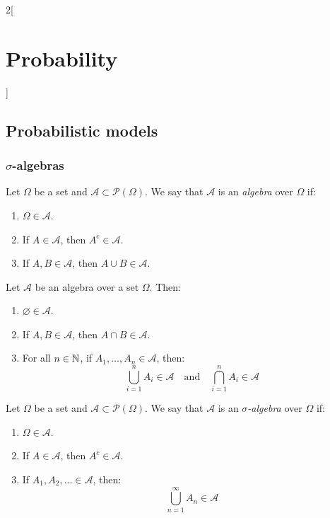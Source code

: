 \documentclass[../../../main.tex]{subfiles}
\begin{document}
\begin{multicols}{2}[\section{Probability}]
    \subsection{Probabilistic models}
    \subsubsection{\texorpdfstring{$\sigma$}{sigma}-algebras}
    \begin{definition}[Algebra]
        Let $\Omega$ be a set and $\mathcal{A}\subset\mathcal{P}(\Omega)$. We say that $\mathcal{A}$ is an \textit{algebra} over $\Omega$ if:
        \begin{enumerate}
            \item $\Omega\in\mathcal{A}$.
            \item If $A\in\mathcal{A}$, then $A^c\in\mathcal{A}$.
            \item If $A,B\in\mathcal{A}$, then $A\cup B\in\mathcal{A}$.
        \end{enumerate}
    \end{definition}
    \begin{prop}
        Let $\mathcal{A}$ be an algebra over a set $\Omega$. Then:
        \begin{enumerate}
            \item $\varnothing\in\mathcal{A}$.
            \item If $A,B\in\mathcal{A}$, then $A\cap B\in\mathcal{A}$.
            \item For all $n\in\mathbb{N}$, if $A_1,\ldots,A_n\in\mathcal{A}$, then: $$\bigcup_{i=1}^nA_i\in\mathcal{A}\quad\text{and}\quad\bigcap_{i=1}^nA_i\in\mathcal{A}$$
        \end{enumerate}
    \end{prop}
    \begin{definition}
        Let $\Omega$ be a set and $\mathcal{A}\subset\mathcal{P}(\Omega)$. We say that $\mathcal{A}$ is an \textit{$\sigma$-algebra} over $\Omega$ if:
        \begin{enumerate}
            \item $\Omega\in\mathcal{A}$.
            \item If $A\in\mathcal{A}$, then $A^c\in\mathcal{A}$.
            \item If $A_1,A_2,\ldots\in\mathcal{A}$, then: $$\bigcup_{n=1}^\infty A_n\in\mathcal{A}$$

\end{enumerate}
\end{definition}
\end{multicols}
\end{document}
